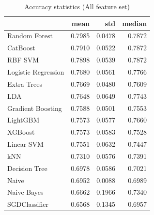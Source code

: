 \begin{table}
\caption{Accuracy statistics (All feature set)}
\label{tab:accuracy_All_stats}
\begin{tabular}{lrrr}
\toprule
 & mean & std & median \\
\midrule
Random Forest & 0.7985 & 0.0478 & 0.7872 \\
CatBoost & 0.7910 & 0.0522 & 0.7872 \\
RBF SVM & 0.7898 & 0.0539 & 0.7872 \\
Logistic Regression & 0.7680 & 0.0561 & 0.7766 \\
Extra Trees & 0.7669 & 0.0480 & 0.7609 \\
LDA & 0.7648 & 0.0649 & 0.7743 \\
Gradient Boosting & 0.7588 & 0.0501 & 0.7553 \\
LightGBM & 0.7573 & 0.0577 & 0.7660 \\
XGBoost & 0.7573 & 0.0583 & 0.7528 \\
Linear SVM & 0.7551 & 0.0632 & 0.7447 \\
kNN & 0.7310 & 0.0576 & 0.7391 \\
Decision Tree & 0.6978 & 0.0586 & 0.7021 \\
Naive & 0.6952 & 0.0088 & 0.6989 \\
Naive Bayes & 0.6662 & 0.1966 & 0.7340 \\
SGDClassifier & 0.6568 & 0.1345 & 0.6957 \\
\bottomrule
\end{tabular}
\end{table}
